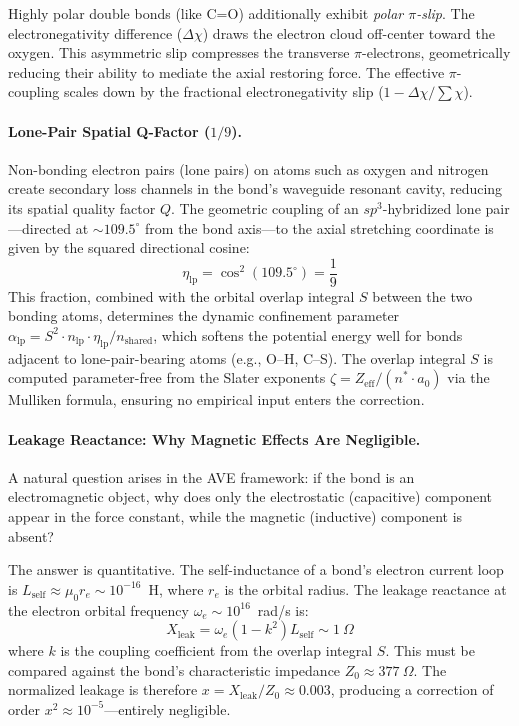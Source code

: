 Highly polar double bonds (like C=O) additionally exhibit \emph{polar $\pi$-slip}. The electronegativity difference ($\Delta \chi$) draws the electron cloud off-center toward the oxygen. This asymmetric slip compresses the transverse $\pi$-electrons, geometrically reducing their ability to mediate the axial restoring force. The effective $\pi$-coupling scales down by the fractional electronegativity slip ($1 - \Delta \chi / \sum \chi$).

\paragraph{Lone-Pair Spatial Q-Factor ($1/9$).}
Non-bonding electron pairs (lone pairs) on atoms such as oxygen and nitrogen create secondary loss channels in the bond's waveguide resonant cavity, reducing its spatial quality factor $Q$. The geometric coupling of an $sp^3$-hybridized lone pair---directed at $\sim 109.5^\circ$ from the bond axis---to the axial stretching coordinate is given by the squared directional cosine:
\begin{equation}
    \eta_{\text{lp}} = \cos^2(109.5^\circ) = \frac{1}{9}
    \label{eq:lp_qfactor}
\end{equation}
This fraction, combined with the orbital overlap integral $S$ between the two bonding atoms, determines the dynamic confinement parameter $\alpha_{\text{lp}} = S^2 \cdot n_{\text{lp}} \cdot \eta_{\text{lp}} / n_{\text{shared}}$, which softens the potential energy well for bonds adjacent to lone-pair-bearing atoms (e.g., O--H, C--S). The overlap integral $S$ is computed parameter-free from the Slater exponents $\zeta = Z_{\text{eff}} / (n^* \cdot a_0)$ via the Mulliken formula, ensuring no empirical input enters the correction.

\paragraph{Leakage Reactance: Why Magnetic Effects Are Negligible.}
A natural question arises in the AVE framework: if the bond is an electromagnetic object, why does only the electrostatic (capacitive) component appear in the force constant, while the magnetic (inductive) component is absent?

The answer is quantitative. The self-inductance of a bond's electron current loop is $L_\text{self} \approx \mu_0 r_e \sim 10^{-16}$~H, where $r_e$ is the orbital radius. The leakage reactance at the electron orbital frequency $\omega_e \sim 10^{16}$~rad/s is:
\begin{equation}
    X_\text{leak} = \omega_e (1 - k^2) L_\text{self} \sim 1~\Omega
    \label{eq:leakage_reactance}
\end{equation}
where $k$ is the coupling coefficient from the overlap integral $S$. This must be compared against the bond's characteristic impedance $Z_0 \approx 377~\Omega$. The normalized leakage is therefore $x = X_\text{leak}/Z_0 \approx 0.003$, producing a correction of order $x^2 \approx 10^{-5}$---entirely negligible.

